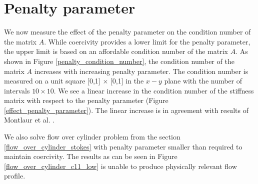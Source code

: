 \documentclass[a4paper,openany]{book}
\begin{document}
\section{Penalty parameter}

We now measure the effect of the penalty parameter on the condition number of the matrix $A$. While coercivity provides a lower limit for the penalty parameter, the upper limit is based on an affordable condition number of the matrix $A$. As shown in Figure \ref{penalty_condition_number}, the condition number of the matrix $A$ increases with increasing penalty parameter.
The condition number is measured on a unit square [0,1] $\times$ [0,1] in the $x-y$ plane with the number of intervals $10 \times 10$. We see a linear increase in the condition number of the stiffness matrix with respect to the penalty parameter (Figure \ref{effect_penalty_parameter}). The linear increase is in agreement with results of Montlaur et al. \cite{Montlaur}.

We also solve flow over cylinder problem from the section \ref{flow_over_cylinder_stokes} with penalty parameter smaller than required to maintain coercivity. The results as can be seen in Figure \ref{flow_over_cylinder_c11_low} is unable to produce physically relevant flow profile.
\end{document}
